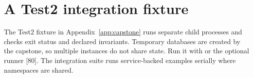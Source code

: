 \section{A Test2 integration fixture}
The Test2 fixture in Appendix~\ref{app:capstone} runs separate child
processes and checks exit status and declared invariants. Temporary
databases are created by the capstone, so multiple instances do not
share state. Run it with  or the optional
 runner [80]. The integration suite runs
service-backed examples serially where namespaces are shared.
